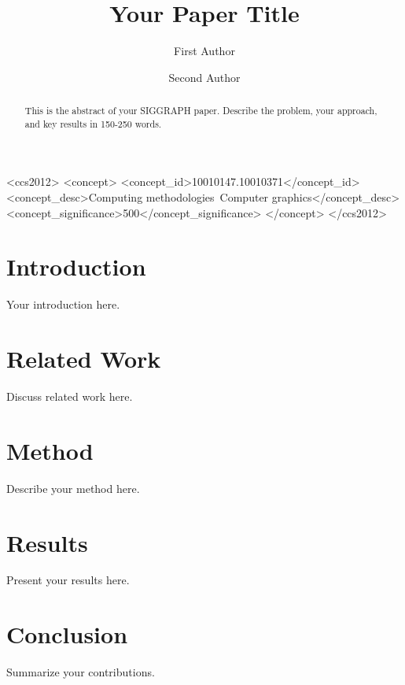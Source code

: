 \documentclass[sigconf,review]{acmart}
\begin{document}
\title{Your Paper Title}

\author{First Author}

\author{Second Author}

\begin{abstract}
This is the abstract of your SIGGRAPH paper. Describe the problem, your approach, and key results in 150-250 words.
\end{abstract}

\begin{CCSXML}
<ccs2012>
<concept>
<concept_id>10010147.10010371</concept_id>
<concept_desc>Computing methodologies~Computer graphics</concept_desc>
<concept_significance>500</concept_significance>
</concept>
</ccs2012>
\end{CCSXML}



\maketitle

\section{Introduction}
Your introduction here.

\section{Related Work}
Discuss related work here.

\section{Method}
Describe your method here.

\section{Results}
Present your results here.

\section{Conclusion}
Summarize your contributions.



\end{document}

